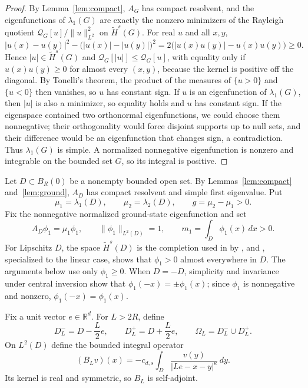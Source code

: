 \documentclass[twoside,10pt]{article}
\numberwithin{equation}{section}
\theoremstyle{slbody}
\theoremstyle{definition}
\newcommand{\R}{\mathbb{R}}
\newcommand{\Hs}{\widetilde H^s}
\newcommand{\norm}[1]{\lVert #1\rVert}
\newcommand{\abs}[1]{\lvert #1\rvert}
\begin{document}
\begin{proof}
By Lemma~\ref{lem:compact}, $A_G$ has compact resolvent, and the
eigenfunctions of $\lambda_1(G)$ are exactly the nonzero minimizers of the
Rayleigh quotient $\mathcal{Q}_G[u]/\norm{u}_{L^2}^2$ on $\Hs(G)$.  For real $u$
and all $x,y$,
\[
 \abs{u(x)-u(y)}^2-\bigl(\abs{u(x)}-\abs{u(y)}\bigr)^2
 =2\bigl(\abs{u(x)u(y)}-u(x)u(y)\bigr)\geq0.
\]
Hence $\abs u\in\Hs(G)$ and $\mathcal{Q}_G[\abs u]\leq\mathcal{Q}_G[u]$, with
equality only if $u(x)u(y)\geq0$ for almost every $(x,y)$, because the kernel
is positive off the diagonal.  By Tonelli's theorem, the product of the
measures of $\{u>0\}$ and $\{u<0\}$ then vanishes, so $u$ has constant sign.
If $u$ is an eigenfunction of $\lambda_1(G)$, then $\abs u$ is also a
minimizer, so equality holds and $u$ has constant sign.  If the eigenspace
contained two orthonormal eigenfunctions, we could choose them nonnegative;
their orthogonality would force disjoint supports up to null sets, and their
difference would be an eigenfunction that changes sign, a contradiction.
Thus $\lambda_1(G)$ is simple.  A normalized nonnegative eigenfunction is
nonzero and integrable on the bounded set $G$, so its integral is positive.
\end{proof}

Let $D\subset B_R(0)$ be a nonempty bounded open set.  By
Lemmas~\ref{lem:compact} and~\ref{lem:ground}, $A_D$ has compact resolvent and
simple first eigenvalue.  Put
\[
 \mu_1=\lambda_1(D),
 \qquad \mu_2=\lambda_2(D),
 \qquad g=\mu_2-\mu_1>0.
\]
Fix the nonnegative normalized ground-state eigenfunction and set
\begin{equation}\label{eq:mass}
 A_D\phi_1=\mu_1\phi_1,
 \qquad \norm{\phi_1}_{L^2(D)}=1,
 \qquad m_1=\int_D\phi_1(x)\,dx>0.
\end{equation}
For Lipschitz $D$, the space $\Hs(D)$ is the completion used in
\cite{BrascoParini2016} by \cite[Section~2, equation~(2.1)]{DjitteFallWeth2021},
and \cite[Theorem~2.8]{BrascoParini2016}, specialized to the linear case, shows
that $\phi_1>0$ almost everywhere in $D$.  The arguments below use only
$\phi_1\geq0$.  When $D=-D$, simplicity and invariance under central inversion
show that $\phi_1(-x)=\pm\phi_1(x)$; since $\phi_1$ is nonnegative and nonzero,
$\phi_1(-x)=\phi_1(x)$.

Fix a unit vector $e\in\R^d$.  For $L>2R$, define
\[
 D_L^- =D-\frac L2e,
 \qquad D_L^+=D+\frac L2e,
 \qquad \Omega_L=D_L^-\cup D_L^+.
\]
On $L^2(D)$ define the bounded integral operator
\begin{equation}\label{eq:B}
 (B_Lv)(x)
 =-c_{d,s}\int_D\frac{v(y)}{\abs{Le-x-y}^{\kappa}}\,dy.
\end{equation}
Its kernel is real and symmetric, so $B_L$ is self-adjoint.
\end{document}

